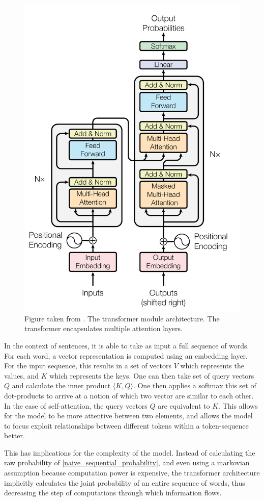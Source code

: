 \documentclass[a4paper,12pt,twoside,openright]{report}
\begin{document}

\begin{figure}[H]
	\center
  \includegraphics[width=0.5\linewidth]{./assets/background/transformer_module.png}
  \caption{Figure taken from \cite{vaswani17}. The transformer module architecture. The transformer encapsulates multiple attention layers.}
  \label{fig:attention_is_all_you_need}
\end{figure}

In the context of sentences, it is able to take as input a full sequence of words.
For each word, a vector representation is computed using an embedding layer.
For the input sequence, this results in a set of vectors $V$ which represents the values, and $K$ which represents the keys.
One can then take set of query vectors $Q$ and calculate the inner product $\langle K, Q \rangle$.
One then applies a softmax this set of dot-products to arrive at a notion of which two vector are similar to each other.
In the case of self-attention, the query vectors $Q$ are equivalent to $K$.
This allows for the model to be more attentive between two elements, and allows the model to focus exploit relationships between different tokens within a token-sequence better.


This has implications for the complexity of the model.
Instead of calculating the raw probability of \eqref{naive_sequential_probability}, and even using a markovian assumption because computation power is expensive, the transformer architecture implicitly calculates the joint probability of an entire sequence of words, thus decreasing the step of computations through which information flows. \\
\end{document}
